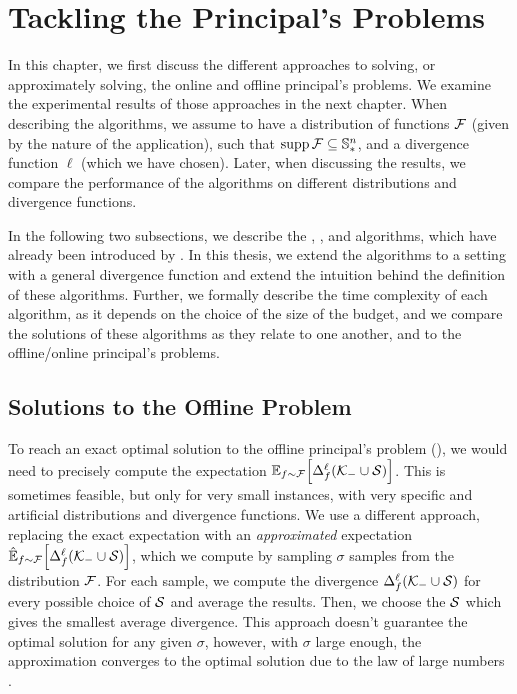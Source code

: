 \chapter{Tackling the Principal's Problems}
\label{chap:pp}

In this chapter, we first discuss the different approaches to solving, or approximately solving, the online and offline principal's problems.
We examine the experimental results of those approaches in the next chapter.
When describing the algorithms, we assume to have a distribution of functions $ \mathcal{F} $ (given by the nature of the application), such that $ \operatorname{supp} \mathcal{F} \subseteq \mathbb{S}^n_* $, and a divergence function $ \ell $ (which we have chosen).
Later, when discussing the results, we compare the performance of the algorithms on different distributions and divergence functions.

In the following two subsections, we describe the \algFO{}, \algFG{}, \algRO{} and \algRG{} algorithms, which have already been introduced by \cite{uradnik2024reducing}.
In this thesis, we extend the algorithms to a setting with a general divergence function and extend the intuition behind the definition of these algorithms.
Further, we formally describe the time complexity of each algorithm, as it depends on the choice of the size of the budget, and we compare the solutions of these algorithms as they relate to one another, and to the offline/online principal's problems.

\section{Solutions to the Offline Problem}

To reach an exact optimal solution to the offline principal's problem (), we would need to precisely compute the expectation $ \operatorname*{\mathbb{E}}_{f \sim \mathcal{F}}\!\left[ \Delta_{f}^{\ell}\!\left(\mathcal{K}_- \cup \mathcal{S}\right) \right] $.
This is sometimes feasible, but only for very small instances, with very specific and artificial distributions and divergence functions.
We use a different approach, replacing the exact expectation with an \emph{approximated} expectation $ \operatorname*{\hat{\mathbb{E}}}_{f \sim \mathcal{F}}\!\left[ \Delta_{f}^{\ell}\!\left(\mathcal{K}_- \cup \mathcal{S}\right) \right] $, which we compute by sampling $ \sigma $ samples from the distribution $ \mathcal{F} $.
For each sample, we compute the divergence $ \Delta_{f}^{\ell}\!\left(\mathcal{K}_- \cup \mathcal{S}\right) $ for every possible choice of $ \mathcal{S} $ and average the results.
Then, we choose the $ \mathcal{S} $ which gives the smallest average divergence.
This approach doesn't guarantee the optimal solution for any given $ \sigma $, however, with $ \sigma $ large enough, the approximation converges to the optimal solution due to the law of large numbers \citep{Bernoulli1713}.


